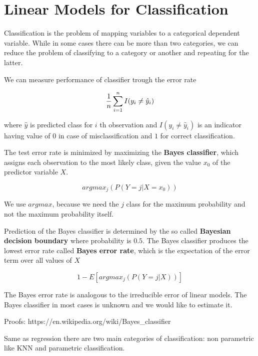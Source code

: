 \chapter{Linear Models for Classification}

Classification is the problem of mapping variables to a categorical dependent variable. While in some cases there can be more than two categories, we can reduce the problem of classifying to a category or another and repeating for the latter.

We can measure performance of classifier trough the error rate

\[{1 \over n} \sum_{i=1}^nI(y_i \ne \hat y_i)\]

where \(\hat y\) is predicted class for \(i\) th observation and \(I(y_i \ne \hat y_i)\) is an indicator having value of \(0\) in case of misclassification and \(1\) for correct classification.

The test error rate is minimized by maximizing the \textbf{Bayes classifier}, which assigns each observation to the most likely class, given the value \(x_0\) of the predictor variable \(X\).

\begin{equation}argmax_j(P(Y = j | X = x_0))\tag{5.1}\end{equation}

We use \(argmax\), because we need the \(j\) class for the maximum probability and not the maximum probability itself.

Prediction of the Bayes classifier is determined by the so called \textbf{Bayesian decision boundary} where probability is \(0.5\). The Bayes classifier produces the lowest error rate called \textbf{Bayes error rate}, which is the expectation of the error term over all values of \(X\)

\[1 - E[argmax_j(P(Y = j | X))]\]

The Bayes error rate is analogous to the irreducible error of linear models. The Bayes classifier in most cases is unknown and we would like to estimate it.

Proofs:
https://en.wikipedia.org/wiki/Bayes\_classifier

Same as regression there are two main categories of classification: non parametric like KNN and parametric classification.

